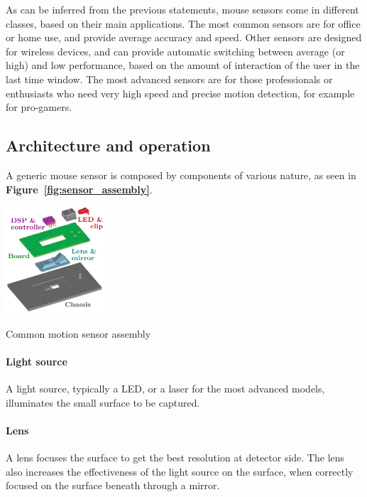 \documentclass[a4paper,10pt]{article}
\makeatletter
\newenvironment{figurehere}{\def\@captype{figure}\vspace{2ex}}{\vspace{2ex}}
\newcommand{\citef}[1]{\textbf{Figure~\ref{#1}}}
\makeatother
\begin{document}
\begin{multicols}{2}
As can be inferred from the previous statements, mouse sensors come in
different classes, based on their main applications. The most common sensors
are for office or home use, and provide average accuracy and speed. Other
sensors are designed for wireless devices, and can provide automatic switching
between average (or high) and low performance, based on the amount of
interaction of the user in the last time window. The most advanced sensors are
for those professionals or enthusiasts who need very high speed and precise
motion detection, for example for pro-gamers.


\subsection{Architecture and operation}

A generic mouse sensor is composed by components of various nature, as seen
in \citef{fig:sensor_assembly}.

\begin{figurehere}
	\centering
	\includegraphics[keepaspectratio=true,height=4cm]{images/sensor_assembly.pdf}
	\caption{Common motion sensor assembly}
	\label{fig:sensor_assembly}
\end{figurehere}


\paragraph{Light source}
A light source, typically a LED, or a laser for the most advanced models,
illuminates the small surface to be captured.


\paragraph{Lens}
A lens focuses the surface to get the best resolution at detector side.
The lens also increases the effectiveness of the light source on the surface,
when correctly focused on the surface beneath through a mirror.


\end{multicols}
\end{document}
